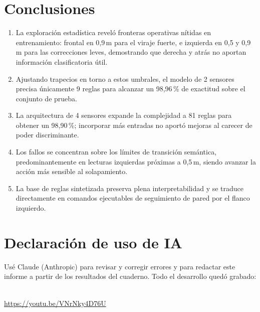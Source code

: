 \documentclass[11pt,letterpaper]{article}
\begin{document}
\section{Conclusiones}

\begin{enumerate}
\item La exploración estadística reveló fronteras operativas nítidas en entrenamiento: frontal en 0,9\,m para el viraje fuerte, e izquierda en 0,5 y 0,9\,m para las correcciones leves, demostrando que derecha y atrás no aportan información clasificatoria útil.
\item Ajustando trapecios en torno a estos umbrales, el modelo de 2 sensores precisa únicamente 9 reglas para alcanzar un 98,96\,\% de exactitud sobre el conjunto de prueba.
\item La arquitectura de 4 sensores expande la complejidad a 81 reglas para obtener un 98,90\,\%; incorporar más entradas no aportó mejoras al carecer de poder discriminante.
\item Los fallos se concentran sobre los límites de transición semántica, predominantemente en lecturas izquierdas próximas a 0,5\,m, siendo avanzar la acción más sensible al solapamiento.
\item La base de reglas sintetizada preserva plena interpretabilidad y se traduce directamente en comandos ejecutables de seguimiento de pared por el flanco izquierdo.
\end{enumerate}

\section{Declaración de uso de IA}\label{sec:ia}

Usé Claude (Anthropic) para revisar y corregir errores y para redactar este informe a partir de los resultados del cuaderno. Todo el desarrollo quedó grabado:

\begin{center}
\\[0.6em]
\url{https://youtu.be/VNrNky4D76U}
\end{center}
\end{document}

